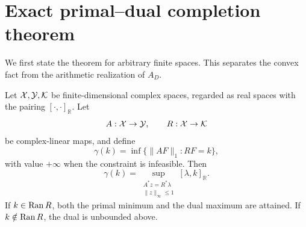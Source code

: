 \section{Exact primal--dual completion theorem}
\label{sec:primal-dual}

We first state the theorem for arbitrary finite spaces.  This separates the
convex fact from the arithmetic realization of \(A_D\).

\begin{theorem}
\label{thm:strong-completion-duality}
Let \(\mathcal X,\mathcal Y,\mathcal K\) be finite-dimensional complex spaces, regarded as
real spaces with the pairing \([\cdot,\cdot]_{\mathbb R}\).  Let
\[
 A:\mathcal X\to\mathcal Y,\qquad R:\mathcal X\to\mathcal K
\]
be complex-linear maps, and define
\[
 \gamma(k)
 =
 \inf\{\|AF\|_1:RF=k\},
\]
with value \(+\infty\) when the constraint is infeasible.  Then
\begin{equation}
 \boxed{
 \gamma(k)
 =
 \sup_{\substack{A^*z=R^*\lambda\\\|z\|_\infty\le1}}
 [\lambda,k]_{\mathbb R}.}
 \label{eq:strong-dual}
\end{equation}
If \(k\in\operatorname{Ran} R\), both the primal minimum and the dual maximum are
attained.  If \(k\notin\operatorname{Ran} R\), the dual is unbounded above.
\end{theorem}


